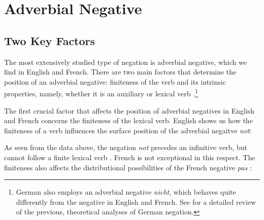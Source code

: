 \documentclass[output=paper
                ,modfonts
                		,nonflat
	        ,collection
	        ,collectionchapter
	        ,collectiontoclongg
 	        ,biblatex
                ,babelshorthands
                ,newtxmath
                ,draftmode
                ,colorlinks, citecolor=brown
]{./langsci/langscibook}
\begin{document}
{%
\section{Adverbial Negative}

\subsection{Two Key Factors}


The most extensively studied type of negation is adverbial negative, which
we find in English and French.
There are two main factors
that determine the position of an adverbial negative: finiteness of
the verb and its intrinsic properties, namely, whether it is an auxiliary
or lexical  verb \citep[see]{Kim:00, KS:02}.\footnote{German also
employs an adverbial negative \textit{nicht}, which behaves quite
differently from the negative in English and French. See \citet{MuellerGT-Eng1}
for a detailed review of the previous, theoretical analyses of German negation.}


The first crucial factor that affects  the position of adverbial
negatives in English and French concerns the finiteness of the lexical  verb.
English shows us how the finiteness of a verb influences the
surface position of the adverbial negaitve \textit{not}:

\begin{exe}
\ex\label{eng-fin-neg} \begin{xlist}
\zl


\begin{exe}
\ex\label{fr-fin-neg} \begin{xlist}
\zl
%
\noindent As seen from the data above, the negation \textit{not} precedes an infinitive verb, but cannot follow
a finite lexical  verb  \citep[see]{Baker:89,Baker:91,Ernst:92}.
French is not exceptional in this respect. The finiteness also affects the distributional possibilities of the French negative {\it pas} \citep[see]{AG:97, KS:02, Zeijlstra:07}:

\eal{}
\zl


\end{xlist}
\end{exe}
\end{xlist}
\end{exe}}
\end{document}

